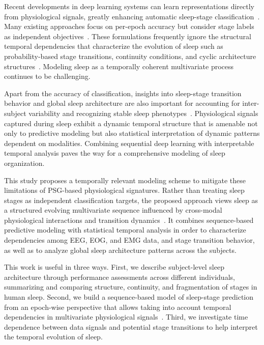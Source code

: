 \documentclass[10pt]{cai26}
\begin{document}
Recent developments in deep learning systems can learn representations directly from physiological signals, greatly enhancing automatic sleep-stage classification~\cite{Supratak2017,Chambon2018}. Many 
existing approaches focus on per-epoch accuracy but consider stage labels as independent objectives~\cite{Supratak2017}. These formulations frequently ignore the structural temporal 
dependencies that characterize the evolution of sleep such as probability-based stage transitions, continuity conditions, and cyclic architecture structures~\cite{Phan2019}. Modeling 
sleep as a temporally coherent multivariate process continues to be challenging.

Apart from the accuracy of classification, insights into sleep-stage transition behavior and global sleep architecture are also important for accounting for 
inter-subject variability and recognizing stable sleep phenotypes~\cite{Phan2019J,Phan2022}. Physiological signals captured during sleep exhibit a dynamic temporal structure that is amenable not 
only to predictive modeling but also statistical interpretation of dynamic patterns dependent on modalities. Combining sequential deep learning with interpretable 
temporal analysis paves the way for a comprehensive modeling of sleep organization.

This study proposes a temporally relevant modeling scheme to mitigate these limitations of PSG-based physiological signatures. Rather than treating sleep stages as 
independent classification targets, the proposed approach views sleep as a structured evolving multivariate sequence influenced by cross-modal physiological interactions 
and transition dynamics~\cite{Chambon2018,Phan2022}. It combines sequence-based predictive modeling with statistical temporal analysis in order to characterize dependencies among EEG, EOG, and EMG 
data, and stage transition behavior, as well as to analyze global sleep architecture patterns across the subjects.

This work is useful in three ways. First, we describe subject-level sleep architecture through performance assessments across different individuals, summarizing and 
comparing structure, continuity, and fragmentation of stages in human sleep. Second, we build a sequence-based model of sleep-stage prediction from an epoch-wise 
perspective that allows taking into account temporal dependencies in multivariate physiological signals~\cite{Supratak2017,Phan2019,Pham2023}. Third, we investigate time dependence between data signals and 
potential stage transitions to help interpret the temporal evolution of sleep.
\end{document}
